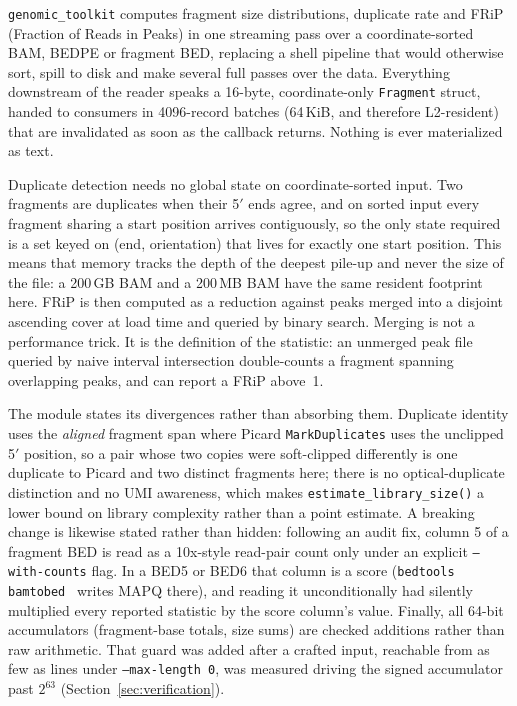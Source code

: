 \documentclass[10pt,twocolumn]{article}
\begin{document}
\texttt{genomic\_toolkit} computes fragment size distributions, duplicate
rate and FRiP (Fraction of Reads in Peaks) in one streaming pass over a
coordinate-sorted BAM, BEDPE or fragment BED, replacing a shell pipeline that
would otherwise sort, spill to disk and make several full passes over the
data. Everything downstream of the reader speaks a 16-byte, coordinate-only
\texttt{Fragment} struct, handed to consumers in 4096-record batches
(64\,KiB, and therefore L2-resident) that are invalidated as soon as the
callback returns. Nothing is ever materialized as text.

Duplicate detection needs no global state on coordinate-sorted input. Two
fragments are duplicates when their 5$'$ ends agree, and on sorted input every
fragment sharing a start position arrives contiguously, so the only state
required is a set keyed on (end, orientation) that lives for exactly one
start position. This means that memory tracks the depth of the deepest
pile-up and never the size of the file: a 200\,GB BAM and a 200\,MB BAM have
the same resident footprint here. FRiP is then computed as a reduction
against peaks merged into a disjoint ascending cover at load time and queried
by binary search. Merging is not a performance trick. It is the definition of
the statistic: an unmerged peak file queried by naive interval intersection
double-counts a fragment spanning overlapping peaks, and can report a FRiP
above~1.

The module states its divergences rather than absorbing them. Duplicate
identity uses the \emph{aligned} fragment span where Picard
\texttt{MarkDuplicates} uses the unclipped 5$'$ position, so a pair whose two
copies were soft-clipped differently is one duplicate to Picard and two
distinct fragments here; there is no optical-duplicate distinction and no UMI
awareness, which makes \texttt{estimate\_library\_size()} a lower bound on
library complexity rather than a point estimate. A breaking change is
likewise stated rather than hidden: following an audit fix, column 5 of a
fragment BED is read as a 10x-style read-pair count only under an explicit
\texttt{--with-counts} flag. In a BED5 or BED6 that column is a score
(\texttt{bedtools bamtobed}~\citep{quinlan2010bedtools} writes MAPQ there),
and reading it unconditionally had silently multiplied every reported
statistic by the score column's value. Finally, all 64-bit accumulators
(fragment-base totals, size sums) are checked additions rather than raw
arithmetic. That guard was added after a crafted input, reachable from as few
as \GtkOverflowLinesSigned{} lines under \texttt{--max-length 0}, was measured
driving the signed accumulator past $2^{63}$
(Section~\ref{sec:verification}).
\end{document}
